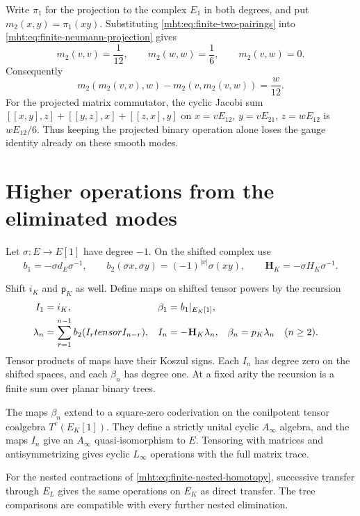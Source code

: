 Write $\pi_1$ for the projection to the complex $E_1$ in both
degrees, and put $m_2(x,y)=\pi_1(xy)$. Substituting
\eqref{mht:eq:finite-two-pairings} into
\eqref{mht:eq:finite-neumann-projection} gives
\begin{equation}\label{mht:eq:finite-product-table}
 m_2(v,v)=\frac1{12},\qquad
 m_2(w,w)=\frac16,\qquad m_2(v,w)=0.
\end{equation}
Consequently
\begin{equation}\label{mht:eq:finite-associator}
 m_2(m_2(v,v),w)-m_2(v,m_2(v,w))=\frac w{12}.
\end{equation}
For the projected matrix commutator, the cyclic Jacobi sum
$[[x,y],z]+[[y,z],x]+[[z,x],y]$ on
$x=vE_{12}$, $y=vE_{21}$, $z=wE_{12}$ is $wE_{12}/6$.
Thus keeping the projected binary operation alone loses the gauge
identity already on these smooth modes.

\section{Higher operations from the eliminated modes}

Let $\sigma:E\to E[1]$ have degree $-1$. On the shifted complex use
\[
 b_1=-\sigma d_E\sigma^{-1},\qquad
 b_2(\sigma x,\sigma y)=(-1)^{|x|}\sigma(xy),\qquad
 \mathbf H_K=-\sigma H_K\sigma^{-1}.
\]

Shift $i_K$ and $\mathsf p_K$ as well. Define maps on shifted tensor powers
by the recursion
\begin{align}
 I_1&=i_K,&\beta_1&=b_1|_{E_K[1]},\notag\\
 \lambda_n&=\sum_{r=1}^{n-1}b_2(I_r\otimes I_{n-r}),&
 I_n&=-\mathbf H_K\lambda_n,&
 \beta_n&=\mathsf p_K\lambda_n\quad(n\geq2).
 \label{mht:eq:finite-tree-recursion}
\end{align}
Tensor products of maps have their Koszul signs. Each $I_n$ has
degree zero on the shifted spaces, and each $\beta_n$ has degree
one. At a fixed arity the recursion is a finite sum over planar
binary trees.

\begin{theorem}\label{mht:thm:finite-cyclic-transfer}
The maps $\beta_n$ extend to a square-zero coderivation on the
conilpotent tensor coalgebra $T^c(E_K[1])$. They define a strictly
unital cyclic $A_\infty$ algebra, and the maps $I_n$ give an
$A_\infty$ quasi-isomorphism to $E$. Tensoring with matrices and
antisymmetrizing gives cyclic $L_\infty$ operations with the full
matrix trace.

For the nested contractions of
\eqref{mht:eq:finite-nested-homotopy}, successive transfer through
$E_L$ gives the same operations on $E_K$ as direct transfer.
The tree comparisons are compatible with every further nested
elimination.
\end{theorem}

